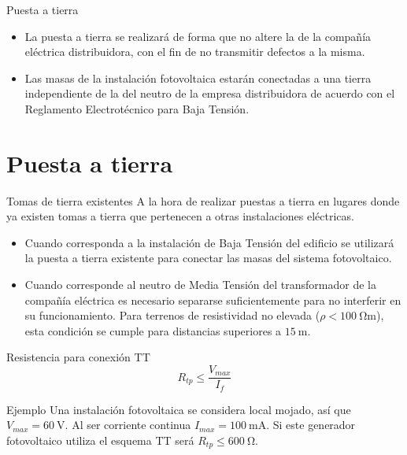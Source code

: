 \documentclass[xcolor={usenames,svgnames,dvipsnames}]{beamer}
\begin{document}
\begin{frame}[label={sec:orgdeb03af}]{Puesta a tierra}
\begin{itemize}
\item \alert{La puesta a tierra} se realizará de forma que \alert{no altere la de la
compañía eléctrica distribuidora}, con el fin de no transmitir
defectos a la misma.

\item \alert{Las masas de la instalación fotovoltaica estarán conectadas a una
tierra independiente de la del neutro} de la empresa distribuidora
de acuerdo con el Reglamento Electrotécnico para Baja Tensión.
\end{itemize}
\end{frame}


\section{Puesta a tierra}
\label{sec:orgbc800ea}

\begin{frame}[label={sec:orgb6b9ca3}]{Tomas de tierra existentes}
A la hora de realizar puestas a tierra en lugares donde ya existen
tomas a tierra que pertenecen a otras instalaciones eléctricas.

\begin{itemize}
\item Cuando corresponda a la \alert{instalación de Baja Tensión del edificio}
\alert{se utilizará la puesta a tierra existente} para conectar las masas
del sistema fotovoltaico.

\item Cuando corresponde al \alert{neutro de Media Tensión del transformador de
la compañía eléctrica} es necesario \alert{separarse suficientemente} para
no interferir en su funcionamiento. Para terrenos de resistividad no
elevada (\(\rho<\SI{100}{\ohm\meter}\)), esta condición se cumple para
distancias superiores a \(\SI{15}{\meter}\).
\end{itemize}
\end{frame}


\begin{frame}[label={sec:org263eea1}]{Resistencia para conexión TT}
$$R_{tp}\leq\frac{V_{max}}{I_{f}}$$

\begin{block}{Ejemplo}
Una instalación fotovoltaica se considera local mojado,
así que \(V_{max}=\SI{60}{\volt}\). Al ser corriente continua
\(I_{max}=\SI{100}{\milli\ampere}\). Si este generador fotovoltaico
utiliza el esquema TT será \(R_{tp}\leq\SI{600}{\ohm}\).
\end{block}
\end{frame}
\end{document}
